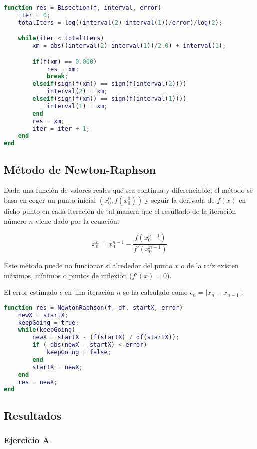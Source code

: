 \begin{lstlisting}[language=Matlab, caption={Algorítmo de bisección.},captionpos=b,texcl=true]
function res = Bisection(f, interval, error)
	iter = 0;
	totalIters = log((interval(2)-interval(1))/error)/log(2);

	while(iter < totalIters)
		xm = abs((interval(2)-interval(1))/2.0) + interval(1);

		if(f(xm) == 0.000)
			res = xm;
			break;
		elseif(sign(f(xm)) == sign(f(interval(2))))
			interval(2) = xm;
		elseif(sign(f(xm)) == sign(f(interval(1))))
			interval(1) = xm;
		end
		res = xm;
		iter = iter + 1;
	end
end
\end{lstlisting}

\subsection{Método de Newton-Raphson}
Dada una función de valores reales que sea continua y diferenciable, el método se basa en coger un punto inicial \((x_0^0, f(x_0^0))\) y seguir la derivada de \(f(x)\) en dicho punto en cada iteración de tal manera que el resultado de la iteración número \(n\) viene dado por la ecuación.

\[x_0^n = x_0^{n-1} - \frac{ f(x_0^{n-1}) } { f'(x_0^{n-1}) } \]

Este método puede no funcionar si alrededor del punto \(x\) o de la raíz existen máximos, mínimos o puntos de inflexión (\(f'(x) = 0\)).

El error estimado \(\epsilon\) en una iteración \(n\) se ha calculado como \(\epsilon_n = | x_n - x_{n-1} | \).

\begin{lstlisting}[language=Matlab, caption={Algorítmo de Newton-Raphson},captionpos=b,texcl=true]
function res = NewtonRaphson(f, df, startX, error)
	newX = startX;
	keepGoing = true;
	while(keepGoing)
		newX = startX - (f(startX) / df(startX));
		if ( abs(newX - startX) < error)
			keepGoing = false;
		end
		startX = newX;
	end
	res = newX;
end
\end{lstlisting}

\subsection{Resultados}

\subsubsection{Ejercicio A}


